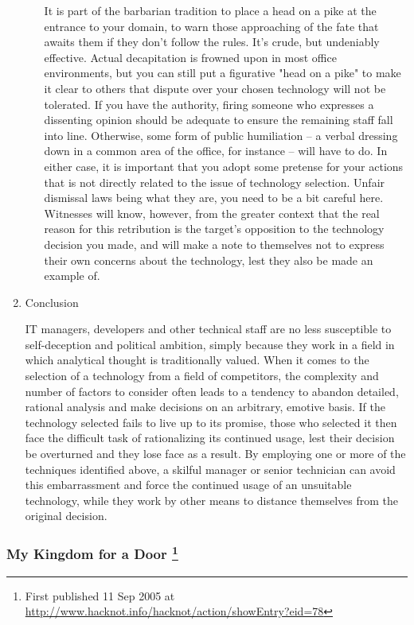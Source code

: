 \documentclass{article}
\begin{document}
\begin{enumerate}
\begin{enumerate}
It is part of the barbarian tradition to place a head on a pike at the
entrance to your domain, to warn those approaching of the fate that
awaits them if they don't follow the rules. It's crude, but undeniably
effective. Actual decapitation is frowned upon in most office
environments, but you can still put a figurative "head on a pike" to
make it clear to others that dispute over your chosen technology will
not be tolerated. If you have the authority, firing someone who
expresses a dissenting opinion should be adequate to ensure the
remaining staff fall into line. Otherwise, some form of public
humiliation -- a verbal dressing down in a common area of the office,
for instance -- will have to do. In either case, it is important that
you adopt some pretense for your actions that is not directly related to
the issue of technology selection. Unfair dismissal laws being what they
are, you need to be a bit careful here. Witnesses will know, however,
from the greater context that the real reason for this retribution is
the target's opposition to the technology decision you made, and will
make a note to themselves not to express their own concerns about the
technology, lest they also be made an example of.
\end{enumerate}

\item Conclusion
\label{sec:orgheadline50}

IT managers, developers and other technical staff are no less
susceptible to self-deception and political ambition, simply because
they work in a field in which analytical thought is traditionally
valued. When it comes to the selection of a technology from a field of
competitors, the complexity and number of factors to consider often
leads to a tendency to abandon detailed, rational analysis and make
decisions on an arbitrary, emotive basis. If the technology selected
fails to live up to its promise, those who selected it then face the
difficult task of rationalizing its continued usage, lest their decision
be overturned and they lose face as a result. By employing one or more
of the techniques identified above, a skilful manager or senior
technician can avoid this embarrassment and force the continued usage of
an unsuitable technology, while they work by other means to distance
themselves from the original decision.
\end{enumerate}

\subsubsection{My Kingdom for a Door  \footnote{First published 11 Sep 2005 at
\url{http://www.hacknot.info/hacknot/action/showEntry?eid=78}}}
\label{sec:orgheadline57}
\end{document}
